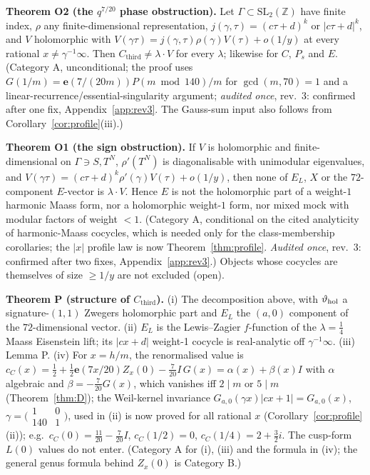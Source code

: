\documentclass[11pt]{article}
\theoremstyle{definition}
\theoremstyle{plain}
\newcommand{\Z}{\mathbb{Z}}
\newcommand{\e}{\mathbf{e}}
\newcommand{\Cthird}{C_{\mathrm{third}}}
\begin{document}
\noindent\textbf{Theorem O2 (the $q^{7/20}$ phase obstruction).} Let $\Gamma\subset\mathrm{SL}_2(\Z)$ have finite index, $\rho$ any
finite-dimensional representation, $j(\gamma,\tau)=(c\tau+d)^k$ or $|c\tau+d|^k$, and $V$ holomorphic with
$V(\gamma\tau)=j(\gamma,\tau)\rho(\gamma)V(\tau)+o(1/y)$ at every rational $x\neq\gamma^{-1}\infty$. Then $\Cthird\neq\lambda\cdot V$ for every
$\lambda$; likewise for $C$, $P_s$ and $E$. (Category A, unconditional; the proof uses $G(1/m)=\e(7/(20m))P(m\bmod140)/m$ for $\gcd(m,70)=1$ and
a linear-recurrence/essential-singularity argument; \emph{audited once}, rev.~3: confirmed after one fix, Appendix~\ref{app:rev3}. The Gauss-sum input
also follows from Corollary~\ref{cor:profile}(iii).)

\noindent\textbf{Theorem O1 (the sign obstruction).} If $V$ is holomorphic and finite-dimensional on $\Gamma\ni S,T^N$, $\rho'(T^N)$ is
diagonalisable with unimodular eigenvalues, and $V(\gamma\tau)=(c\tau+d)^k\rho'(\gamma)V(\tau)+o(1/y)$, then none of $E_L$, $X$ or the
$72$-component $E$-vector is $\lambda\cdot V$. Hence $E$ is not the holomorphic part of a weight-$1$ harmonic Maass form, nor a holomorphic
weight-$1$ form, nor mixed mock with modular factors of weight $<1$. (Category A, conditional on the cited analyticity of harmonic-Maass
cocycles, which is needed only for the class-membership corollaries; the $|x|$ profile law is now Theorem~\ref{thm:profile}. \emph{Audited once}, rev.~3:
confirmed after two fixes, Appendix~\ref{app:rev3}.) Objects whose cocycles are themselves of size $\ge1/y$ are not
excluded (open).

\noindent\textbf{Theorem P (structure of $\Cthird$).} (i) The decomposition above, with $\vartheta_{\rm hol}$ a signature-$(1,1)$ Zwegers
holomorphic part and $E_L$ the $(a,0)$ component of the $72$-dimensional vector. (ii) $E_L$ is the Lewis--Zagier $f$-function of the
$\lambda=\tfrac14$ Maass Eisenstein lift; its $|cx+d|$ weight-1 cocycle is real-analytic off $\gamma^{-1}\infty$. (iii) Lemma P.
(iv) For $x=h/m$, the renormalised value is $c_C(x)=\tfrac12+\tfrac12\e(7x/20)Z_x(0)-\tfrac7{20}I\,G(x)=\alpha(x)+\beta(x)I$ with $\alpha$
algebraic and $\beta=-\tfrac7{20}G(x)$, which vanishes iff $2\mid m$ or $5\mid m$ (Theorem~\ref{thm:D}); the Weil-kernel invariance $G_{a,0}(\gamma x)|cx+1|=G_{a,0}(x)$,
$\gamma=\bigl(\begin{smallmatrix}1&0\\140&1\end{smallmatrix}\bigr)$, used in (ii) is now proved for all rational $x$ (Corollary~\ref{cor:profile}(ii)); e.g.\ $c_C(0)=\tfrac{11}{20}-\tfrac7{20}I$, $c_C(1/2)=0$,
$c_C(1/4)=2+\tfrac32i$. The cusp-form $L(0)$ values do not enter. (Category A for (i), (iii) and the formula in (iv); the general genus formula
behind $Z_x(0)$ is Category B.)
\end{document}

